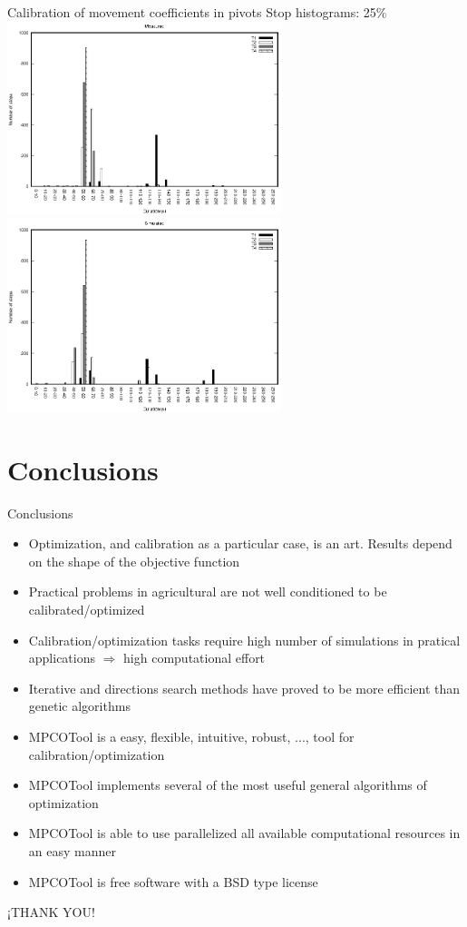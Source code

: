 \documentclass[10pt]{beamer}
\begin{document}
\begin{frame}{Calibration of movement coefficients in pivots}
{Stop histograms: 25\%}
	\includegraphics[width=0.60\textwidth]{pivot-measured-stops-25.eps}\\
	\includegraphics[width=0.60\textwidth]{pivot-simulated-stops-25.eps}
\end{frame}

\section{Conclusions}

\begin{frame}{Conclusions}
\begin{itemize}
	\item Optimization, and calibration as a particular case, is an art. Results
		depend on the shape of the objective function
	\item Practical problems in agricultural are not well conditioned to be
		calibrated/optimized
	\item Calibration/optimization tasks require high number of simulations in
		pratical applications $\Rightarrow$ high computational effort
	\item Iterative and directions search methods have proved to be more efficient
		than genetic algorithms
	\item MPCOTool is a easy, flexible, intuitive, robust, ..., tool for
		calibration/optimization
	\item MPCOTool implements several of the most useful general algorithms of
		optimization
	\item MPCOTool is able to use parallelized all available computational
		resources in an easy manner
	\item MPCOTool is free software with a BSD type license
\end{itemize}
\end{frame}

\begin{frame}
	\begin{center}
		\LARGE ¡THANK YOU!\\
	\end{center}
\end{frame}
\end{document}
